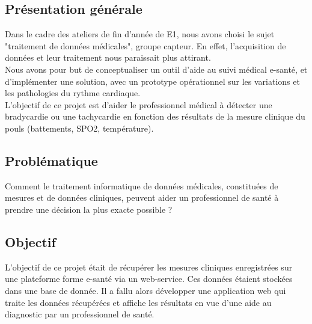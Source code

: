 	\subsection{Présentation générale}
Dans le cadre des ateliers de fin d'année de E1, nous avons choisi le sujet "traitement de données médicales", groupe capteur. En effet, l'acquisition de données et leur traitement nous paraissait plus attirant.\\
Nous avons pour but de conceptualiser un outil d'aide au suivi médical e-santé, et d'implémenter une solution, avec un prototype opérationnel sur les variations et les pathologies du rythme cardiaque.\\
L'objectif de ce projet est d'aider le professionnel médical à détecter une bradycardie ou une tachycardie en fonction des résultats de la mesure clinique du pouls (battements, SPO2, température). 

	\subsection{Problématique}
Comment le traitement informatique de données médicales, constituées de mesures et de données cliniques, peuvent aider un professionnel de santé à prendre une décision la plus exacte possible ? 

	\subsection{Objectif}
L'objectif de ce projet était de récupérer les mesures cliniques enregistrées sur une plateforme forme e-santé via un web-service. Ces données étaient stockées dans une base de donnée. Il a fallu alors développer une application web qui traite les données récupérées et affiche les résultats en vue d'une aide au diagnostic par un professionnel de santé.
